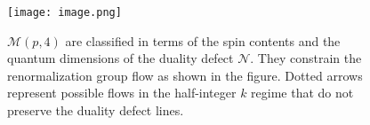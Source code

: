 \documentclass[12pt,a4paper]{article}
\begin{document}
\begin{figure}[h]
    \centering
    \texttt{[image: image.png]}
    \caption{$\mathcal{M}(p, 4)$ are classified in terms of the spin contents and the quantum dimensions of the duality defect $\mathcal{N}$. They constrain the renormalization group flow as shown in the figure. Dotted arrows represent possible flows in the half-integer $k$ regime that do not preserve the duality defect lines.}
    \label{fig:duality_defect_flow}
\end{figure}
\end{document}
